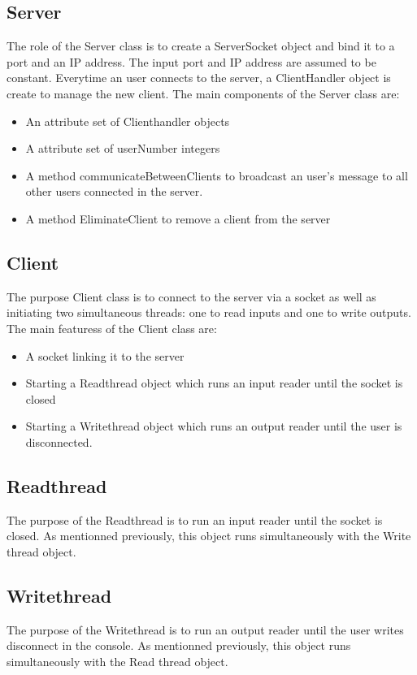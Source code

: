 \documentclass[11pt,letterpaper]{article}
\begin{document}
\subsection{Server}
The role of the Server class is to create a ServerSocket object and bind it to a port and an IP address. The input port and IP address are assumed to be constant. Everytime an user connects to the server, a ClientHandler object is create to manage the new client. The main components of the Server class are:

\begin{itemize}
  \item An attribute set of Clienthandler objects
  \item A attribute set of userNumber integers
\item A method communicateBetweenClients to broadcast an user's message to all other users connected in the server.
\item A method EliminateClient to remove a client from the server
\end{itemize}

\subsection{Client}
The purpose Client class is to connect to the server via a socket as well as initiating two simultaneous threads: one to read inputs and one to write outputs. The main featuress of the Client class are:
\begin{itemize}
  \item A socket linking it to the server
  \item Starting a Readthread object which runs an input reader until the socket is closed
  \item Starting a Writethread object which runs an output reader until the user is disconnected.
\end{itemize}

\subsection{Readthread}
The purpose of the Readthread is to run an input reader until the socket is closed. As mentionned previously, this object runs simultaneously with the Write thread object.

\subsection{Writethread}
The purpose of the Writethread is to run an output  reader until the user writes disconnect in the console. As mentionned previously, this object runs simultaneously with the Read thread object.
\end{document}
